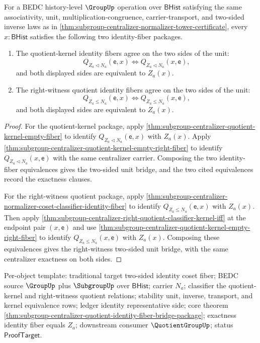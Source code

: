 \begin{theorem}
\label{thm:subgroup-centralizer-quotient-identity-fiber-bridge-package}
For a BEDC history-level $\GroupUp$ operation over $\mathsf{BHist}$ satisfying
the same associativity, unit, multiplication-congruence, carrier-transport,
and two-sided inverse laws as in
\autoref{thm:subgroup-centralizer-normalizer-tower-certificate}, every
$x:\mathsf{BHist}$ satisfies the following two identity-fiber packages.
\begin{enumerate}
\item The quotient-kernel identity fibers agree on the two sides of the unit:
$$
Q_{Z_a\triangleleft N_a}(\mathsf{e},x)
\Longleftrightarrow Q_{Z_a\triangleleft N_a}(x,\mathsf{e}),
$$
and both displayed sides are equivalent to $Z_a(x)$.
\item The right-witness quotient identity fibers agree on the two sides of the
unit:
$$
Q_{Z_a\leq N_a}(\mathsf{e},x)
\Longleftrightarrow Q_{Z_a\leq N_a}(x,\mathsf{e}),
$$
and both displayed sides are equivalent to $Z_a(x)$.
\end{enumerate}
\end{theorem}
\begin{proof}
For the quotient-kernel package, apply
\autoref{thm:subgroup-centralizer-quotient-kernel-empty-fiber} to identify
$Q_{Z_a\triangleleft N_a}(\mathsf{e},x)$ with $Z_a(x)$. Apply
\autoref{thm:subgroup-centralizer-quotient-kernel-empty-right-fiber} to
identify $Q_{Z_a\triangleleft N_a}(x,\mathsf{e})$ with the same centralizer
carrier. Composing the two identity-fiber equivalences gives the two-sided
unit bridge, and the two cited equivalences record the exactness clauses.

For the right-witness quotient package, apply
\autoref{thm:subgroup-centralizer-normalizer-coset-classifier-identity-fiber}
to identify $Q_{Z_a\leq N_a}(\mathsf{e},x)$ with $Z_a(x)$. Then apply
\autoref{thm:subgroup-centralizer-right-quotient-classifier-kernel-iff} at
the endpoint pair $(x,\mathsf{e})$ and use
\autoref{thm:subgroup-centralizer-quotient-kernel-empty-right-fiber} to
identify $Q_{Z_a\leq N_a}(x,\mathsf{e})$ with $Z_a(x)$. Composing these
equivalences gives the right-witness two-sided unit bridge, with the same
centralizer exactness on both sides.
\end{proof}

Per-object template: traditional target two-sided identity coset fiber; BEDC
source $\GroupUp$ plus $\SubgroupUp$ over $\mathsf{BHist}$; carrier $N_a$;
classifier the quotient-kernel and right-witness quotient relations; stability
unit, inverse, transport, and kernel equivalence rows; ledger identity
representative side; core theorem
\autoref{thm:subgroup-centralizer-quotient-identity-fiber-bridge-package};
exactness identity fiber equals $Z_a$; downstream consumer
$\QuotientGroupUp$; status $\mathsf{ProofTarget}$.


